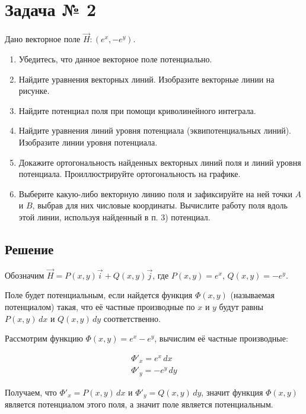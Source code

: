 \section{Задача № 2}

Дано векторное поле \(\vec{H} : \left( e^x, -e^y \right)\).

\begin{enumerate}
  \item Убедитесь, что данное векторное поле потенциально.
  \item Найдите уравнения векторных линий. Изобразите векторные линии на
        рисунке.
  \item Найдите потенциал поля при помощи криволинейного интеграла.
  \item Найдите уравнения линий уровня потенциала (эквипотенциальных линий).
        Изобразите линии уровня потенциала.
  \item Докажите ортогональность найденных векторных линий поля и линий уровня
        потенциала. Проиллюстрируйте ортогональность на графике.
  \item Выберите какую-либо векторную линию поля и зафиксируйте на ней точки
        \(A\) и \(B\), выбрав для них числовые координаты. Вычислите работу поля
        вдоль этой линии, используя найденный в п. 3) потенциал.
\end{enumerate}

\subsection{Решение}

Обозначим \(\vec{H} = P(x, y) \vec{i} + Q(x, y) \vec{j}\), где
\(P(x, y) = e^x\), \(Q(x, y ) = -e^y\).

Поле будет потенциальным, если найдется функция \(\Phi(x, y)\) (называемая
потенциалом) такая, что её частные производные по \(x\) и \(y\) будут равны
\(P(x, y)\,dx\) и \(Q(x, y)\,dy\) соответственно.

Рассмотрим функцию \(\Phi(x, y) = e^x - e^y\), вычислим её частные производные:

\begin{equation*}\begin{split}
    \Phi'_x = e^x\,dx \\
    \Phi'_y = -e^y\,dy
  \end{split}\end{equation*}

Получаем, что \(\Phi'_x = P(x, y)\,dx\) и \(\Phi'_y = Q(x, y)\,dy\), значит
функция \(\Phi(x, y)\) является потенциалом этого поля, а значит поле является
потенциальным.

